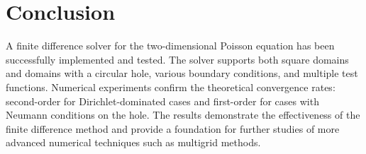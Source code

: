 \documentclass[12pt,a4paper]{article}
\begin{document}
\section{Conclusion}
A finite difference solver for the two-dimensional Poisson equation has been successfully implemented and tested. The solver supports both square domains and domains with a circular hole, various boundary conditions, and multiple test functions. Numerical experiments confirm the theoretical convergence rates: second-order for Dirichlet-dominated cases and first-order for cases with Neumann conditions on the hole. The results demonstrate the effectiveness of the finite difference method and provide a foundation for further studies of more advanced numerical techniques such as multigrid methods.
\end{document}
